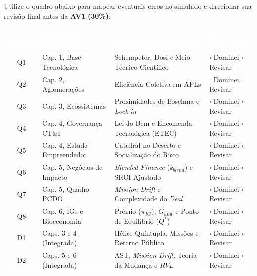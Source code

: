 Utilize o quadro abaixo para mapear eventuais erros no simulado e direcionar sua revisão final antes da \textbf{AV1 (30\%)}:

\renewcommand{\arraystretch}{1.18}
\small
\begin{tabularx}{\textwidth}{@{}c p{4.2cm} X p{3.0cm}@{}}
  \toprule
  \rowcolor{etIndigo}
  \textcolor{white}{\bfseries Questão} & \textcolor{white}{\bfseries Capítulo de Referência} & \textcolor{white}{\bfseries Conceito-Chave Avaliado} & \textcolor{white}{\bfseries Meu Status} \\
  \midrule
  Q1 & Cap. 1, Base Tecnológica & Schumpeter, Dosi e Meio Técnico-Científico & $\square$ Dominei \quad $\square$ Revisar \\
  \rowcolor{bgGray}
  Q2 & Cap. 2, Aglomerações & Eficiência Coletiva em APLs & $\square$ Dominei \quad $\square$ Revisar \\
  Q3 & Cap. 3, Ecossistemas & Proximidades de Boschma e \textit{Lock-in} & $\square$ Dominei \quad $\square$ Revisar \\
  \rowcolor{bgGray}
  Q4 & Cap. 4, Governança CT\&I & Lei do Bem e Encomenda Tecnológica (ETEC) & $\square$ Dominei \quad $\square$ Revisar \\
  Q5 & Cap. 4, Estado Empreendedor & Catedral no Deserto e Socialização do Risco & $\square$ Dominei \quad $\square$ Revisar \\
  \rowcolor{bgGray}
  Q6 & Cap. 5, Negócios de Impacto & \textit{Blended Finance} ($k_{blend}$) e SROI Ajustado & $\square$ Dominei \quad $\square$ Revisar \\
  Q7 & Cap. 5, Quadro PCDO & \textit{Mission Drift} e Complexidade do \textit{Deal} & $\square$ Dominei \quad $\square$ Revisar \\
  \rowcolor{bgGray}
  Q8 & Cap. 6, IGs e Bioeconomia & Prêmio ($\pi_{IG}$), $G_{unit}$ e Ponto de Equilíbrio ($Q^*$) & $\square$ Dominei \quad $\square$ Revisar \\
  D1 & Caps. 3 e 4 (Integrada) & Hélice Quíntupla, Missões e Retorno Público & $\square$ Dominei \quad $\square$ Revisar \\
  \rowcolor{bgGray}
  D2 & Caps. 5 e 6 (Integrada) & AST, \textit{Mission Drift}, Teoria da Mudança e $RVL$ & $\square$ Dominei \quad $\square$ Revisar \\
  \bottomrule
\end{tabularx}
\normalsize
